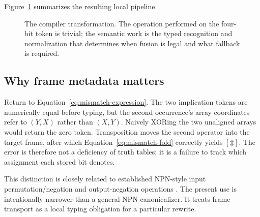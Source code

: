 \documentclass[10pt]{article}
\newcommand{\bxor}{\mathbin{\Updownarrow}}
\theoremstyle{plain}
\theoremstyle{definition}
\theoremstyle{remark}
\begin{document}
Figure~\ref{fig:compiler-flow} summarizes the resulting local pipeline.

\begin{figure}[H]
\centering
{}
\caption{The compiler transformation. The operation performed on the four-bit token is trivial; the semantic work is the typed recognition and normalization that determines when fusion is legal and what fallback is required.}
\label{fig:compiler-flow}
\end{figure}

\subsection{Why frame metadata matters}

Return to Equation~\eqref{eq:mismatch-expression}. The two implication tokens are numerically equal before typing, but the second occurrence's array coordinates refer to $(Y,X)$ rather than $(X,Y)$. Naively XORing the two unaligned arrays would return the zero token. Transposition moves the second operator into the target frame, after which Equation~\eqref{eq:mismatch-fold} correctly yields $[\bxor]$. The error is therefore not a deficiency of truth tables; it is a failure to track which assignment each stored bit denotes.

This distinction is closely related to established NPN-style input permutation/negation and output-negation operations \cite{Mishchenko2006,Zhou2019}. The present use is intentionally narrower than a general NPN canonicalizer. It treats frame transport as a local typing obligation for a particular rewrite.
\end{document}

